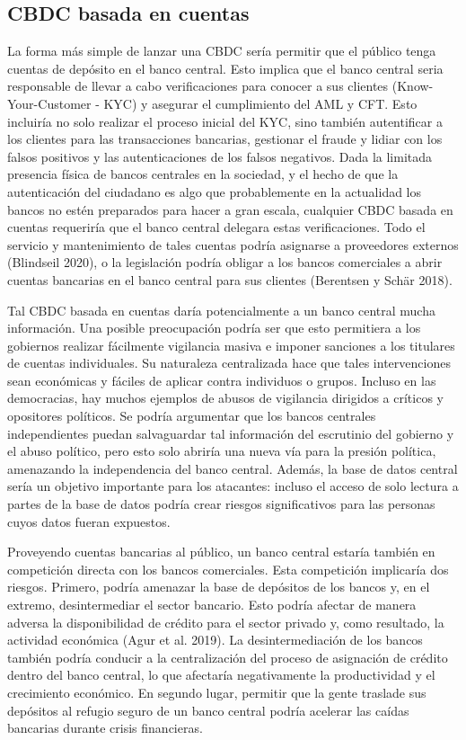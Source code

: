 \documentclass[10pt,spanish]{article}
\begin{document}
\hypertarget{cbdc-basada-en-cuentas}{%
\subsection{CBDC basada en cuentas}\label{cbdc-basada-en-cuentas}}

La forma más simple de lanzar una CBDC sería permitir que el público
tenga cuentas de depósito en el banco central. Esto implica que el banco
central seria responsable de llevar a cabo verificaciones para conocer a
sus clientes (Know-Your-Customer - KYC) y asegurar el cumplimiento del
AML y CFT. Esto incluiría no solo realizar el proceso inicial del KYC,
sino también autentificar a los clientes para las transacciones
bancarias, gestionar el fraude y lidiar con los falsos positivos y las
autenticaciones de los falsos negativos. Dada la limitada presencia
física de bancos centrales en la sociedad, y el hecho de que la
autenticación del ciudadano es algo que probablemente en la actualidad
los bancos no estén preparados para hacer a gran escala, cualquier CBDC
basada en cuentas requeriría que el banco central delegara estas
verificaciones. Todo el servicio y mantenimiento de tales cuentas podría
asignarse a proveedores externos (Blindseil 2020), o la legislación
podría obligar a los bancos comerciales a abrir cuentas bancarias en el
banco central para sus clientes (Berentsen y Schär 2018).

Tal CBDC basada en cuentas daría potencialmente a un banco central mucha
información. Una posible preocupación podría ser que esto permitiera a
los gobiernos realizar fácilmente vigilancia masiva e imponer sanciones
a los titulares de cuentas individuales. Su naturaleza centralizada hace
que tales intervenciones sean económicas y fáciles de aplicar contra
individuos o grupos. Incluso en las democracias, hay muchos ejemplos de
abusos de vigilancia dirigidos a críticos y opositores políticos. Se
podría argumentar que los bancos centrales independientes puedan
salvaguardar tal información del escrutinio del gobierno y el abuso
político, pero esto solo abriría una nueva vía para la presión política,
amenazando la independencia del banco central. Además, la base de datos
central sería un objetivo importante para los atacantes: incluso el
acceso de solo lectura a partes de la base de datos podría crear riesgos
significativos para las personas cuyos datos fueran expuestos.

Proveyendo cuentas bancarias al público, un banco central estaría
también en competición directa con los bancos comerciales. Esta
competición implicaría dos riesgos. Primero, podría amenazar la base de
depósitos de los bancos y, en el extremo, desintermediar el sector
bancario. Esto podría afectar de manera adversa la disponibilidad de
crédito para el sector privado y, como resultado, la actividad económica
(Agur et al. 2019). La desintermediación de los bancos también podría
conducir a la centralización del proceso de asignación de crédito dentro
del banco central, lo que afectaría negativamente la productividad y el
crecimiento económico. En segundo lugar, permitir que la gente traslade
sus depósitos al refugio seguro de un banco central podría acelerar las
caídas bancarias durante crisis financieras.
\end{document}
